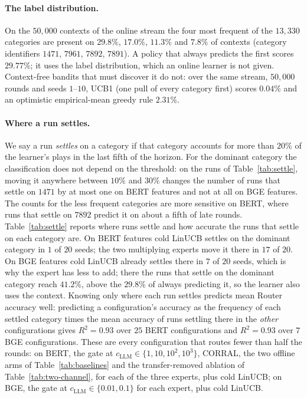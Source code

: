 \documentclass{article}
\theoremstyle{definition}
\theoremstyle{remark}
\theoremstyle{remark}
\begin{document}
\paragraph{The label distribution.}
On the $50{,}000$ contexts of the online stream the four most frequent of the
$13{,}330$ categories are present on $29.8\%$, $17.0\%$, $11.3\%$ and $7.8\%$
of contexts (category identifiers $1471$, $7961$, $7892$, $7891$). A policy
that always predicts the first scores $29.77\%$; it uses the label
distribution, which an online learner is not given. Context-free bandits that
must discover it do not: over the same stream, $50{,}000$ rounds and seeds
$1$--$10$, UCB1 (one pull of every category first) scores $0.04\%$ and an
optimistic empirical-mean greedy rule $2.31\%$.

\paragraph{Where a run settles.}
We say a run \emph{settles} on a category if that category accounts for more
than $20\%$ of the learner's plays in the last fifth of the horizon. For the
dominant category the classification does not depend on the threshold: on the
runs of Table~\ref{tab:settle}, moving it anywhere between $10\%$ and $30\%$
changes the number of runs that settle on $1471$ by at most one on BERT
features and not at all on BGE features. The counts for the less frequent
categories are more sensitive on BERT, where runs that settle on $7892$
predict it on about a fifth of late rounds. Table~\ref{tab:settle}
reports where runs settle and how accurate the runs that settle on each
category are. On BERT features cold LinUCB settles on the dominant category
in $1$ of $20$ seeds; the two multiplying experts move it there in $17$ of
$20$. On BGE features cold LinUCB already settles there in $7$ of $20$ seeds,
which is why the expert has less to add; there the runs that settle on the
dominant category reach $41.2\%$, above the $29.8\%$ of always predicting
it, so the learner also uses the context. Knowing only where each run
settles predicts mean Router accuracy well: predicting a configuration's
accuracy as the frequency of each settled category times the mean accuracy
of runs settling there in the \emph{other} configurations gives $R^2=0.93$
over $25$ BERT configurations and $R^2=0.93$ over $7$ BGE configurations.
These are every configuration that routes fewer than half the rounds: on
BERT, the gate at $c_{\mathrm{LLM}}\in\{1,10,10^2,10^3\}$, CORRAL, the two offline arms of
Table~\ref{tab:baselines} and the transfer-removed ablation of
Table~\ref{tab:two-channel}, for each of the three experts, plus cold
LinUCB; on BGE, the gate at $c_{\mathrm{LLM}}\in\{0.01,0.1\}$ for each expert, plus cold
LinUCB.
\end{document}
